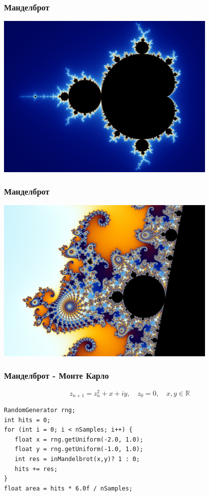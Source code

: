 
\begin{frame}
  \frametitle{Манделброт}
    \includegraphics[height=8.0cm]{Mandel_zoom_00_mandelbrot_set.jpg}
\end{frame}
\begin{frame}
  \frametitle{Манделброт}
    \includegraphics[height=8.0cm]{Mandel_zoom_03_seehorse.jpg}
\end{frame}

\begin{frame}[fragile]
  \frametitle{Манделброт - Монте Карло}
  \begin{equation*}
  z_{n+1} = z_n^2 + x + iy, \quad z_0 = 0, \quad x,y \in \mathbb{R} 
  \end{equation*}
  \pause
\begin{lstlisting}
RandomGenerator rng;
int hits = 0;
for (int i = 0; i < nSamples; i++) {
   float x = rng.getUniform(-2.0, 1.0);
   float y = rng.getUniform(-1.0, 1.0);
   int res = inMandelbrot(x,y)? 1 : 0;
   hits += res;
}
float area = hits * 6.0f / nSamples;
\end{lstlisting}
\end{frame}
